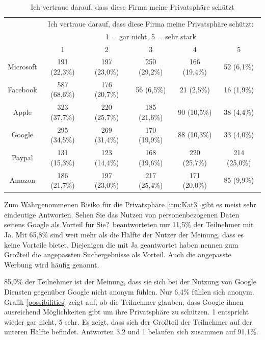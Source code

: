 \begin{table}
	\begin{tabular}[]{ c || c | c | c | c | c }
	& \multicolumn{5}{c}{Ich vertraue darauf, dass diese Firma meine Privatsphäre schützt:}\\
	& \multicolumn{5}{c}{1 = gar nicht, 5 = sehr stark}\\
	& 1 & 2 & 3 & 4 & 5\\ \hline \hline
	Microsoft & 191 (22,3\%) & 197 (23,0\%) & 250 (29,2\%) & 166 (19,4\%) & 52 (6,1\%)\\ \hline
	Facebook & 587 (68,6\%) & 176 (20,7\%) & 56 (6,5\%) & 21 (2,5\%) & 16 (1,9\%)\\ \hline
	Apple & 323 (37,7\%) & 220 (25,7\%) & 185 (21,6\%) & 90 (10,5\%) & 38 (4,4\%)\\ \hline
	Google & 295 (34,5\%) & 269 (31,4\%) & 170 (19,9\%) & 88 (10,3\%) & 33 (4,0\%)\\ \hline
	Paypal & 131 (15,3\%) & 123 (14,4\%) & 168 (19,6\%) & 220 (25,7\%) & 214 (25,0\%)\\ \hline
	Amazon & 186 (21,7\%) & 197 (23,0\%) & 217 (25,4\%) & 171 (20,0\%) & 85 (9,9\%)\\
	\end{tabular}
	\caption{Ich vertraue darauf, dass diese Firma meine Privatsphäre schützt}\label{vertrauenothers}
\end{table}

Zum Wahrgenommenen Risiko für die Privatsphäre \ref{itm:Kat3} gibt es meist sehr eindeutige Antworten. \glqq Sehen Sie das Nutzen von personenbezogenen Daten seitens Google als Vorteil für Sie?\grqq\ beantworteten nur 11,5\% der Teilnehmer mit Ja. Mit 65,8\% sind weit mehr als die Hälfte der Nutzer der Meinung, dass es keine Vorteile bietet.
Diejenigen die mit Ja geantwortet haben nennen zum Großteil die angepassten Suchergebnisse als Vorteil. Auch die angepasste Werbung wird häufig genannt.

85,9\% der Teilnehmer ist der Meinung, dass sie sich bei der Nutzung von Google Diensten gegenüber Google nicht anonym fühlen. Nur 6,4\% fühlen sich anonym.
Grafik \ref{possibilities} zeigt auf, ob die Teilnehmer glauben, dass Google ihnen ausreichend Möglichkeiten gibt um ihre Privatsphäre zu schützen. 1 entspricht wieder gar nicht, 5 sehr. Es zeigt, dass sich der Großteil der Teilnehmer auf der unteren Hälfte befindet. Antworten 3,2 und 1 belaufen sich zusammen auf 91,1\%. 

